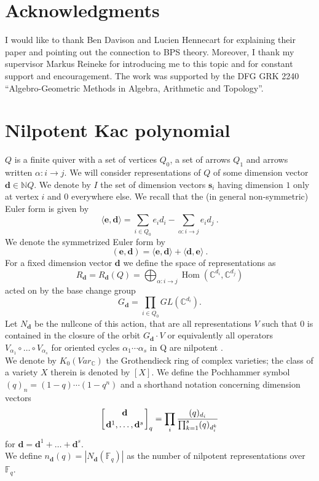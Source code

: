 \documentclass{article}
\newcommand{\bs}{\mathbf{s}}
\newcommand{\bd}{\mathbf{d}}
\newcommand{\be}{\mathbf{e}}
\DeclareMathOperator{\Hom}{Hom}
\begin{document}
\section*{Acknowledgments}
I would like to thank Ben Davison and Lucien Hennecart for explaining their paper \cite{BPS} and pointing out the connection to BPS theory. Moreover, I thank my supervisor Markus Reineke for introducing me to this topic and for constant support and encouragement. 
The work was supported by the DFG GRK 2240 “Algebro-Geometric Methods in Algebra, Arithmetic and Topology”.

\section{Nilpotent Kac polynomial}

$Q$ is a finite quiver with a set of vertices $Q_0$, a set of arrows $Q_1$ and arrows written $\alpha:i \rightarrow j$. We will consider representations of $Q$ of some dimension vector $\bd \in \mathbb{N}Q$. We denote by $I$ the set of dimension vectors $\bs_i$ having dimension $1$ only at vertex $i$ and $0$ everywhere else.
We recall that the (in general non-symmetric) Euler form is given by $$\langle \be, \bd\rangle =\sum_{i \in Q_0} e_id_i- \sum_{\alpha: i \rightarrow j} e_id_j~.$$ 
We denote the symmetrized Euler form by $$(\be,\bd)= \langle \be,\bd \rangle +\langle \bd,\be \rangle~.$$
For a fixed dimension vector $\bd$ we define the space of representations as 
$$R_{\bd}=R_{\bd}(Q)=\bigoplus_{\alpha: i \rightarrow j} \Hom(\mathbb{C}^{d_i}, \mathbb{C}^{d_j})$$
acted on by the base change group
$$G_{\bd} = \prod_{i \in Q_0} GL(\mathbb{C}^{d_i}).$$
Let $N_{\bd}$ be the nullcone of this action, that are all representations $V$ such that $0$ is contained in the closure of the orbit $G_{\bd} \cdot V$ or equivalently all operators $V_{\alpha_1} \circ \dots \circ V_{\alpha_s}$ for oriented cycles $\alpha_1 \cdots \alpha_s$ in Q are nilpotent \cite[section 1.4]{optimalfiltrations}.\\
We denote by $K_0(Var_{\mathbb{C}})$ the Grothendieck ring of complex varieties; the class of a variety $X$
therein is denoted by $[X]$.  We define the Pochhammer symbol $(q)_n = (1 - q) \cdots (1 - q^n)$ and a shorthand notation concerning dimension vectors 
\begin{align*}
 \left[{{\bf d}\atop{{\bf d}^1,\ldots,{\bf d}^s}}\right]_q = \prod_i \frac{(q)_{d_i}}{\prod^s_{k=1} (q)_{d_i^k}}   
\end{align*}
for $\bd = \bd^1 + \dots + \bd^s$.\\
We define $n_{\bd}(q) = |N_{\bd}(\mathbb{F}_q)|$ as the number of nilpotent representations over $\mathbb{F}_q$.
\end{document}
